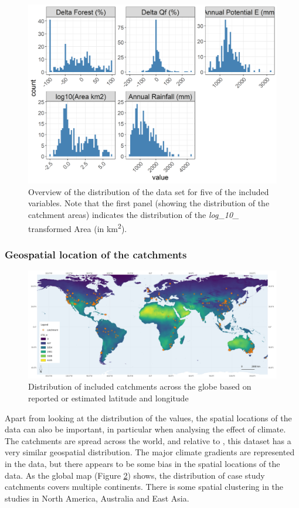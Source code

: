 \documentclass[]{elsarticle} %
\begin{document}
\begin{figure}
\includegraphics[width=0.9\linewidth]{./DataExploration} \caption{Overview of the distribution of the data set for five of the included variables. Note that the first panel (showing the distribution of the catchment areas) indicates the distribution of the \emph{log\_10\_} transformed Area (in km\textsuperscript{2}).}\label{fig:datagraphs}
\end{figure}

\hypertarget{geospatial-location-of-the-catchments}{%
\subsubsection{Geospatial location of the catchments}\label{geospatial-location-of-the-catchments}}

\begin{figure}
\includegraphics[width=0.9\linewidth]{FAOET0data_final_2022} \caption{Distribution of included catchments across the globe based on reported or estimated latitude and longitude}\label{fig:globalmap}
\end{figure}

Apart from looking at the distribution of the values, the spatial locations of the data can also be important, in particular when analysing the effect of climate. The catchments are spread across the world, and relative to \citet{zhang2017}, this dataset has a very similar geospatial distribution. The major climate gradients are represented in the data, but there appears to be some bias in the spatial locations of the data. As the global map (Figure \ref{fig:globalmap}) shows, the distribution of case study catchments covers multiple continents. There is some spatial clustering in the studies in North America, Australia and East Asia.
\end{document}
